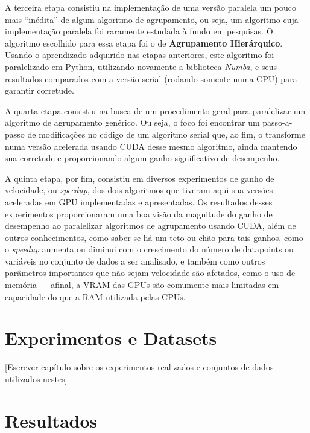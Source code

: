 \documentclass[12pt, %
openright, 
oneside, %
a4paper,    %
brazil]{facom-ufu-abntex2}
\def\qntAlgrtm{dois}
\begin{document}
A terceira etapa consistiu na implementação de uma versão paralela um pouco mais \enquote{inédita} de algum algoritmo de agrupamento, ou seja, um algoritmo cuja implementação paralela foi raramente estudada à fundo em pesquisas. O algoritmo escolhido para essa etapa foi o de \textbf{Agrupamento Hierárquico}. Usando o aprendizado adquirido nas etapas anteriores, este algoritmo foi paralelizado em Python, utilizando novamente a biblioteca \textit{Numba}, e seus resultados comparados com a versão serial (rodando somente numa CPU) para garantir corretude.

A quarta etapa consistiu na busca de um procedimento geral para paralelizar um algoritmo de agrupamento genérico. Ou seja, o foco foi encontrar um passo-a-passo de modificações no código de um algoritmo serial que, ao fim, o transforme numa versão acelerada usando CUDA desse mesmo algoritmo, ainda mantendo sua corretude e proporcionando algum ganho significativo de desempenho.

A quinta etapa, por fim, consistiu em diversos experimentos de ganho de velocidade, ou \textit{speedup}, dos \qntAlgrtm{} algoritmos que tiveram aqui sua versões aceleradas em GPU implementadas e apresentadas. Os resultados desses experimentos proporcionaram uma boa visão da magnitude do ganho de desempenho ao paralelizar algoritmos de agrupamento usando CUDA, além de outros conhecimentos, como saber se há um teto ou chão para tais ganhos, como o \textit{speedup} aumenta ou diminui com o crescimento do número de datapoints ou variáveis no conjunto de dados a ser analisado, e também como outros parâmetros importantes que não sejam velocidade são afetados, como o uso de memória --- afinal, a VRAM das GPUs são comumente mais limitadas em capacidade do que a RAM utilizada pelas CPUs.





\chapter{Experimentos e Datasets}
\label{chp:exp}

[Escrever capítulo sobre os experimentos realizados e conjuntos de dados utilizados nestes]





\chapter{Resultados}
\end{document}
